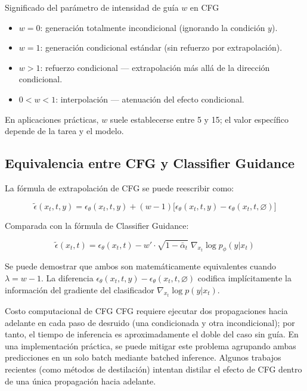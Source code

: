 \documentclass[a4paper]{article}
\begin{document}
\begin{importantbox}{Significado del parámetro de intensidad de guía $w$ en CFG}
\begin{itemize}
    \item $w = 0$: generación totalmente incondicional (ignorando la condición $y$).
    \item $w = 1$: generación condicional estándar (sin refuerzo por extrapolación).
    \item $w > 1$: refuerzo condicional — extrapolación más allá de la dirección condicional.
    \item $0 < w < 1$: interpolación — atenuación del efecto condicional.
\end{itemize}
En aplicaciones prácticas, $w$ suele establecerse entre 5 y 15; el valor específico depende de la tarea y el modelo.
\end{importantbox}

\subsection{Equivalencia entre CFG y Classifier Guidance}

La fórmula de extrapolación de CFG se puede reescribir como:

$$
\tilde{\epsilon}(x_t, t, y) = \epsilon_\theta(x_t, t, y) + (w-1)\bigl[\epsilon_\theta(x_t, t, y) - \epsilon_\theta(x_t, t, \varnothing)\bigr]
$$

Comparada con la fórmula de Classifier Guidance:

$$
\tilde{\epsilon}(x_t, t) = \epsilon_\theta(x_t, t) - w'\cdot\sqrt{1-\bar\alpha_t}\;\nabla_{x_t}\log p_\phi(y|x_t)
$$

Se puede demostrar que ambos son matemáticamente equivalentes cuando $\lambda = w - 1$. La diferencia $\epsilon_\theta(x_t, t, y) - \epsilon_\theta(x_t, t, \varnothing)$ codifica implícitamente la información del gradiente del clasificador $\nabla_{x_t}\log p(y|x_t)$.

\begin{warningbox}{Costo computacional de CFG}
CFG requiere ejecutar dos propagaciones hacia adelante en cada paso de desruido (una condicionada y otra incondicional); por tanto, el tiempo de inferencia es aproximadamente el doble del caso sin guía. En una implementación práctica, se puede mitigar este problema agrupando ambas predicciones en un solo batch mediante batched inference. Algunos trabajos recientes (como métodos de destilación) intentan distilar el efecto de CFG dentro de una única propagación hacia adelante.
\end{warningbox}
\end{document}
